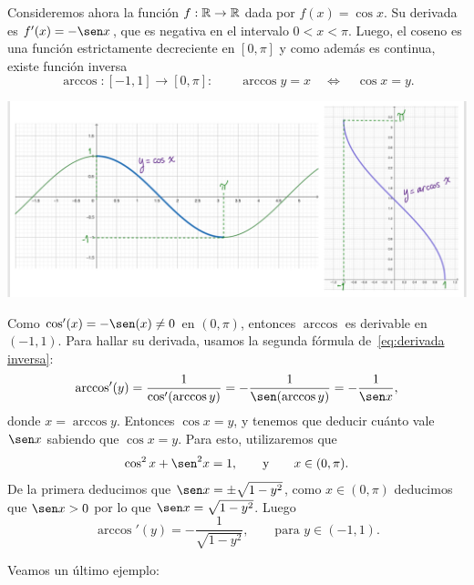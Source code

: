 \begin{example}
    Consideremos ahora la función $f:\mathbb{R}\to\mathbb{R}$ dada por $f(x)=\cos x$. 
    Su derivada es $f'(x)=-\sen x$, que es negativa en el intervalo $0<x<\pi$.
    Luego, el coseno es una función estrictamente decreciente en $[0,\pi]$ y como además es continua, existe función inversa 
    \[
    \arccos: [-1,1] \to [0,\pi]:
    \qquad
    \arccos y = x \quad\iff\quad \cos x = y.
    \]

    \centerline{\includegraphics[width=.8\textwidth]{pics/cos-arccos.jpeg}}
    
    Como $\cos'(x)=-\sen(x)\neq 0$ en $(0,\pi)$, entonces $\arccos$ es derivable en $(-1,1)$.
    Para hallar su derivada, usamos la segunda fórmula de~\eqref{eq:derivada inversa}:
    \[
    \arccos'(y) = \frac{1}{\cos'(\arccos y)}
    = -\frac1{\sen(\arccos y)} = -\frac1{\sen x},
    \]
    donde $x=\arccos y$. Entonces $\cos x=y$, y tenemos que deducir cuánto vale $\sen x$ sabiendo que $\cos x = y$. Para esto, utilizaremos que
    \[
    \cos^2 x + \sen^2 x = 1,\qquad\text{y}\qquad x\in(0,\pi).
    \]
    De la primera deducimos que $\sen x = \pm \sqrt{1-y^2}$, como $x\in(0,\pi)$ deducimos que $\sen x > 0$ por lo que $\sen x =  \sqrt{1-y^2}$. Luego
    \[
    \arccos'(y) = -\frac1{\sqrt{1-y^2}}, \qquad \text{para $y\in (-1,1)$}.
    \]
\end{example}

Veamos un último ejemplo:


